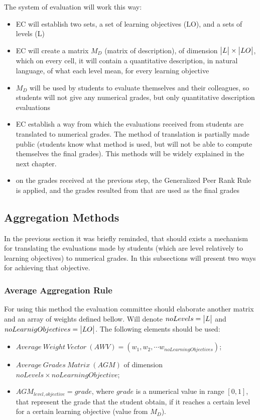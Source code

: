 The system of evaluation will work this way:
\begin{itemize}
	\item EC will establish two sets, a set of learning objectives (LO), and a sets of levels (L)
	\item EC will create a matrix $M_D$ (matrix of description), of dimension $\big{|} L \big{|} \times \big{|} LO \big{|} $, which on every cell, it will contain a quantitative description, in natural language, of what each level mean, for every learning objective
	\item $M_D$ will be used by students to evaluate themselves and their colleagues, so students will not give any numerical grades, but only quantitative description evaluations
	\item EC establish a way from which the evaluations received from students are translated to numerical grades. The method of translation is partially made public (students know what method is used, but will not be able to compute themselves the final grades). This methods will be widely explained in the next chapter. 
	\item on the grades received at the previous step, the Generalized Peer Rank Rule is applied, and the grades resulted from that are used as the final grades
\end{itemize}

\subsection{Aggregation Methods}
In the previous section it was briefly reminded, that should exists a mechanism for translating the evaluations made by students (which are level relatively to learning objectives) to numerical grades. In this subsections will present two ways for achieving that objective.
\subsubsection{Average Aggregation Rule}
For using this method the evaluation committee should elaborate another matrix and an array of weights defined bellow. Will denote $noLevels =  \big{|} L \big{|}$ and $noLearnigObjectives = \big{|} LO \big{|} $. The following elements should be used:
\begin{itemize}
	\item $Average\ Weight\ Vector\ (AWV) = (w_1, w_2, \cdots w_{noLearningObjectives})$;
	\item $Average\ Grades\ Matrix\ (AGM)$ of dimension $noLevels \times noLearningObjective$;
	\item $AGM_{level, objective} = grade$, where $grade$ is a numerical value in range $[0, 1]$, that represent the grade that the student obtain, if it reaches a certain level for a certain learning objective (value from $M_D$).
\end{itemize}

